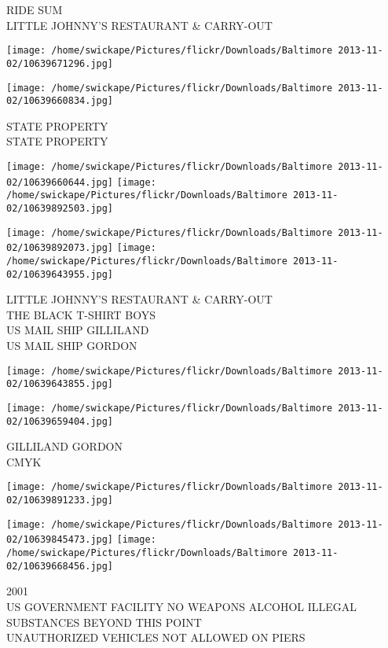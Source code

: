 \documentclass[10pt,letterpaper]{article}
\begin{document}
RIDE SUM\\
LITTLE JOHNNY'S RESTAURANT \& CARRY{-}OUT
\pagebreak

\texttt{[image: /home/swickape/Pictures/flickr/Downloads/Baltimore 2013-11-02/10639671296.jpg]}

\vspace{0.25in}
\texttt{[image: /home/swickape/Pictures/flickr/Downloads/Baltimore 2013-11-02/10639660834.jpg]}

STATE PROPERTY\\
STATE PROPERTY
\pagebreak

\texttt{[image: /home/swickape/Pictures/flickr/Downloads/Baltimore 2013-11-02/10639660644.jpg]}
\texttt{[image: /home/swickape/Pictures/flickr/Downloads/Baltimore 2013-11-02/10639892503.jpg]}

\texttt{[image: /home/swickape/Pictures/flickr/Downloads/Baltimore 2013-11-02/10639892073.jpg]}
\texttt{[image: /home/swickape/Pictures/flickr/Downloads/Baltimore 2013-11-02/10639643955.jpg]}

LITTLE JOHNNY'S RESTAURANT \& CARRY{-}OUT\\
THE BLACK T{-}SHIRT BOYS\\
US MAIL SHIP GILLILAND\\
US MAIL SHIP GORDON
\pagebreak

\texttt{[image: /home/swickape/Pictures/flickr/Downloads/Baltimore 2013-11-02/10639643855.jpg]}

\vspace{0.25in}
\texttt{[image: /home/swickape/Pictures/flickr/Downloads/Baltimore 2013-11-02/10639659404.jpg]}

GILLILAND GORDON\\
CMYK
\pagebreak

\texttt{[image: /home/swickape/Pictures/flickr/Downloads/Baltimore 2013-11-02/10639891233.jpg]}

\vspace{0.25in}
\texttt{[image: /home/swickape/Pictures/flickr/Downloads/Baltimore 2013-11-02/10639845473.jpg]}
\texttt{[image: /home/swickape/Pictures/flickr/Downloads/Baltimore 2013-11-02/10639668456.jpg]}

2001\\
US GOVERNMENT FACILITY NO WEAPONS ALCOHOL ILLEGAL SUBSTANCES BEYOND THIS POINT\\
UNAUTHORIZED VEHICLES NOT ALLOWED ON PIERS
\pagebreak
\end{document}
